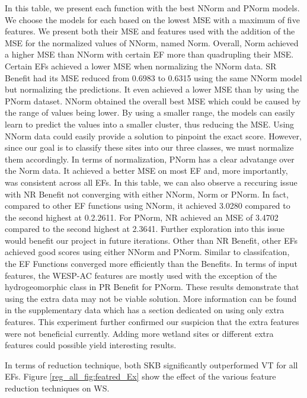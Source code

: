 \documentclass[12pt,letterpaper]{article}
\begin{document}
In this table, we present each function with the best NNorm and PNorm models.
We choose the models for each based on the lowest MSE with a maximum of five features.
We present both their MSE and features used with the addition of the MSE for the normalized values of NNorm, named Norm.
Overall, Norm achieved a higher MSE than NNorm with certain \ac{EF} more than quadrupling their MSE.
Certain \ac{EF}s achieved a lower MSE when normalizing the NNorm data.
\ac{SR} Benefit had its MSE reduced from 0.6983 to 0.6315 using the same NNorm model but normalizing the predictions.
It even achieved a lower MSE than by using the PNorm dataset.
NNorm obtained the overall best MSE which could be caused by the range of values being lower.
By using a smaller range, the models can easily learn to predict the values into a smaller cluster, thus reducing the MSE.
Using NNorm data could easily provide a solution to pinpoint the exact score.
However, since our goal is to classify these sites into our three classes, we must normalize them accordingly.
In terms of normalization, PNorm has a clear advatange over the Norm data.
It achieved a better MSE on most \ac{EF} and, more importantly, was consistent across all \ac{EF}s.
In this table, we can also observe a reccuring issue with \ac{NR} Benefit not converging with either NNorm, Norm or PNorm.
In fact, compared to other \ac{EF} functions using NNorm, it achieved 3.0280 compared to the second highest at 0.2.2611.
For PNorm, \ac{NR} achieved an MSE of 3.4702 compared to the second highest at 2.3641.
Further exploration into this issue would benefit our project in future iterations.
Other than \ac{NR} Benefit, other \ac{EF}s achieved good scores using either NNorm and PNorm.
Similar to classifcation, the \ac{EF} Functions converged more efficiently than the Benefits.
In terms of input features, the WESP-AC features are mostly used with the exception of the hydrogeomorphic class in \ac{PR} Benefit for PNorm.
These results demonstrate that using the extra data may not be viable solution.
More information can be found in the supplementary data which has a section dedicated on using only extra features.
This experiment further confirmed our suspicion that the extra features were not beneficial currently.
Adding more wetland sites or different extra features could possible yield interesting results.


In terms of reduction technique, both \ac{SKB} significantly outperformed \ac{VT} for all \ac{EF}s.
Figure \ref{reg_all_fig:featred_Ex} show the effect of the various feature reduction techniques on \ac{WS}.
\end{document}
